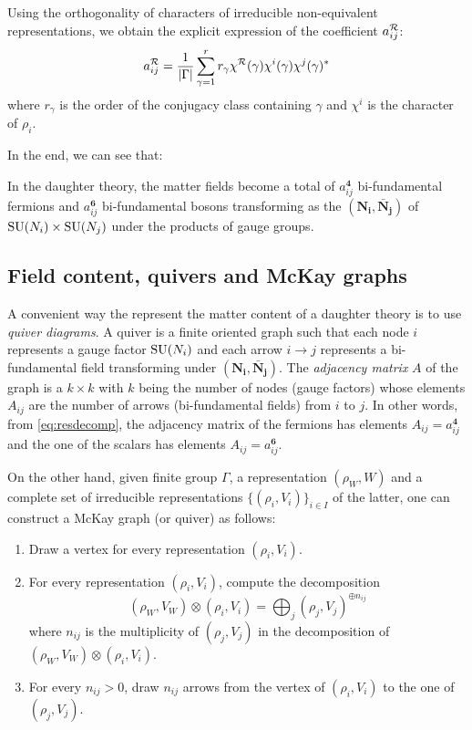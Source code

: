 \documentclass[a4paper,10pt]{article}
\begin{document}
        Using the orthogonality of characters of irreducible non-equivalent representations, we obtain the explicit expression of the coefficient $a^{\mathcal{R}}_{ij}$:
        \begin{equation}
            a^{\mathcal{R}}_{ij} = \frac{1}{\abs{\Gamma}}\sum^r_{\gamma=1} r_\gamma\chi^{\mathcal{R}}(\gamma)\chi^i(\gamma)\chi^j(\gamma)^*
        \end{equation}
        where $r_\gamma$ is the order of the conjugacy class containing $\gamma$ and $\chi^i$ is the character of $\rho_i$.

        In the end, we can see that:
        \begin{result}
            In the daughter theory, the matter fields become a total of $a^{\boldsymbol{4}}_{ij}$ bi-fundamental fermions and $a^{\boldsymbol{6}}_{ij}$ bi-fundamental bosons transforming as the $(\boldsymbol{\textbf{N}_i},\boldsymbol{\bar{\textbf{N}}_j})$ of $\text{SU}(N_i)\times\text{SU}(N_j)$ under the products of gauge groups.
        \end{result}

    \subsection{Field content, quivers and McKay graphs}

        A convenient way the represent the matter content of a daughter theory is to use \emph{quiver diagrams}. A quiver is a finite oriented graph such that each node $i$ represents a gauge factor $\text{SU}(N_i)$ and each arrow $i\to j$ represents a bi-fundamental field transforming under $(\boldsymbol{\textbf{N}_i},\boldsymbol{\bar{\textbf{N}}_j})$. The \emph{adjacency matrix} $A$ of the graph is a $k\times k$ with $k$ being the number of nodes (gauge factors) whose elements $A_{ij}$ are the number of arrows (bi-fundamental fields) from $i$ to $j$. In other words, from \eqref{eq:resdecomp}, the adjacency matrix of the fermions has elements $A_{ij}=a^{\boldsymbol{4}}_{ij}$ and the one of the scalars has elements $A_{ij}=a^{\boldsymbol{6}}_{ij}$.

        On the other hand, given finite group $\Gamma$, a representation $(\rho_W,W)$ and a complete set of irreducible representations $\{(\rho_i,V_i)\}_{i\in I}$ of the latter, one can construct a McKay graph (or quiver) as follows:
        \begin{enumerate}
            \item Draw a vertex for every representation $(\rho_i,V_i)$.
            \item For every representation $(\rho_i,V_i)$, compute the decomposition
            \begin{equation*}
                (\rho_W,V_W)\otimes(\rho_i,V_i)=\bigoplus_j (\rho_j,V_j)^{\oplus n_{ij}}
            \end{equation*}
            where $n_{ij}$ is the multiplicity of $(\rho_j,V_j)$ in the decomposition of $(\rho_W,V_W)\otimes(\rho_i,V_i)$.
            \item For every $n_{ij}>0$, draw $n_{ij}$ arrows from the vertex of $(\rho_i,V_i)$ to the one of $(\rho_j,V_j)$.
        \end{enumerate}
        
\end{document}
